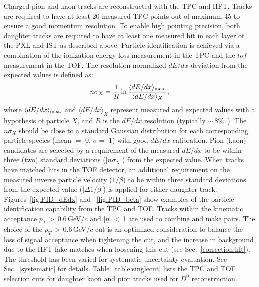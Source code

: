 \documentclass[%
 reprint,	
 amsmath,amssymb,
 aps,
 prc,
]{revtex4-1}
\begin{document}
Charged pion and kaon tracks are reconstructed with the TPC and HFT. Tracks are required to have at least 20 measured TPC points out of maximum 45 to ensure a good momentum resolution. To enable high pointing precision, both daughter tracks are required to have at least one measured hit in each layer of the PXL and IST as described above. Particle identification is achieved via a combination of the ionization energy loss measurement in the TPC and the $tof$ measurement in the TOF. The resolution-normalized $dE/dx$ deviation from the expected values is defined as:
\begin{equation}
  n\sigma_X = \frac{1}{R}\ln\frac{\langle{dE/dx}\rangle_{\rm {mea.}}}{\langle{dE/dx}\rangle_{X}},
\label{equ:equation1}
\end{equation}
where $\langle{dE/dx}\rangle_{\rm {mea.}}$ and $\langle{dE/dx}\rangle_{X}$ represent measured and expected values with a hypothesis of particle $X$, and $R$ is the $dE/dx$ resolution (typically $\sim$\,8\%~\cite{TPC}). The $n\sigma_X$ should be close to a standard Gaussian distribution for each corresponding particle species (mean $=$ 0, $\sigma = $ 1) with good $dE/dx$ calibration.
Pion (kaon) candidates are selected by a requirement of the measured $dE/dx$ to be within three (two) standard deviations ($|n\sigma_{X}|$) from the expected value. When tracks have matched hits in the TOF detector, an additional requirement on the measured inverse particle velocity ($1/\beta$) to be within three standard deviations from the expected value ($|\Delta 1/\beta|$) is applied for either daughter track. Figures~\ref{fig:PID_dEdx} and ~\ref{fig:PID_beta} show examples of the particle identification capability from the TPC and TOF. Tracks within the kinematic acceptance $p_{T}$\,$>$\,0.6\,GeV/$c$ and $|\eta|$\,$<$\,1 are used to combine and make pairs. The choice of the $p_T$\,$>$\,0.6\,GeV/$c$ cut is an optimized consideration to balance the loss of signal acceptance when tightening the cut, and the increase in background due to the HFT fake matches when loosening this cut (see Sec.~\ref{correction:hft}). The threshold has been varied for systematic uncertainty evaluation. See Sec.~\ref{systematic} for details. Table~\ref{table:singlecut} lists the TPC and TOF selection cuts for daughter kaon and pion tracks used for $D^0$ reconstruction.
\end{document}
